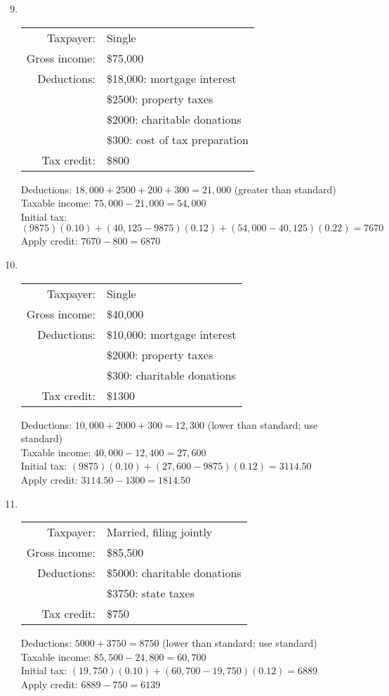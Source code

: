 \begin{enumerate}
\setcounter{enumi}{8}
\item \text{}\\
\begin{tabular}{r l}
Taxpayer: & Single\\
Gross income: & \$75,000\\
Deductions: & \$18,000: mortgage interest\\
& \$2500: property taxes\\
& \$2000: charitable donations\\
& \$300: cost of tax preparation\\
Tax credit: & \$800
\end{tabular} 
\begin{center}
Deductions: $18,000 + 2500 + 200 + 300 = 21,000$ (greater than standard)\\
Taxable income: $75,000 - 21,000 = 54,000$\\
Initial tax: $(9875)(0.10) + (40,125-9875)(0.12) + (54,000-40,125)(0.22) = 7670$\\
Apply credit: $7670 - 800 = 6870$
\end{center}

\item \text{}\\
\begin{tabular}{r l}
Taxpayer: & Single\\
Gross income: & \$40,000\\
Deductions: & \$10,000: mortgage interest\\
& \$2000: property taxes\\
& \$300: charitable donations\\
Tax credit: & \$1300
\end{tabular} 
\begin{center}
Deductions: $10,000 + 2000 + 300 = 12,300$ (lower than standard; use standard)\\
Taxable income: $40,000 - 12,400 = 27,600$\\
Initial tax: $(9875)(0.10) + (27,600-9875)(0.12) = 3114.50$\\
Apply credit: $3114.50 - 1300 = 1814.50$
\end{center}

\item \text{}\\
\begin{tabular}{r l}
Taxpayer: & Married, filing jointly\\
Gross income: & \$85,500\\
Deductions: & \$5000: charitable donations\\
& \$3750: state taxes\\
Tax credit: & \$750
\end{tabular} 
\begin{center}
Deductions: $5000 + 3750 = 8750$ (lower than standard; use standard)\\
Taxable income: $85,500 - 24,800 = 60,700$\\
Initial tax: $(19,750)(0.10) + (60,700-19,750)(0.12) = 6889$\\
Apply credit: $6889 - 750 = 6139$
\end{center}


\end{enumerate}
